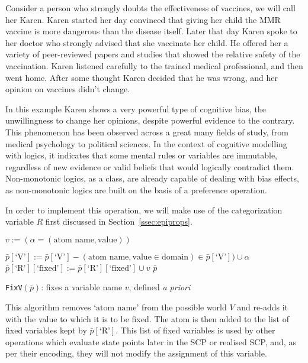 Consider a person who strongly doubts the effectiveness of vaccines, we will call her Karen. Karen started her day convinced that giving her child the MMR vaccine is more dangerous than the disease itself. Later that day Karen spoke to her doctor who strongly advised that she vaccinate her child. He offered her a variety of peer-reviewed papers and studies that showed the relative safety of the vaccination. Karen listened carefully to the trained medical professional, and then went home. After some thought Karen decided that he was wrong, and her opinion on vaccines didn't change.

In this example Karen shows a very powerful type of cognitive bias, the unwillingness to change her opinions, despite powerful evidence to the contrary. This phenomenon has been observed across a great many fields of study, from medical psychology\citep{brown2010omission}\citep{wroe2005feeling} to political sciences\citep{tappin2017heart}. In the context of cognitive modelling with logics, it indicates that some mental rules or variables are immutable, regardless of new evidence or valid beliefs that would logically contradict them. Non-monotonic logics, as a class, are already capable of dealing with bias effects, as non-monotonic logics are built on the basis of a preference operation.

In order to implement this operation, we will make use of the categorization variable $R$ first discussed in Section~\ref{ssec:epiprops}.

\begin{algorithm}[H]
\SetAlgoLined
{}
$v:= (\alpha = (\text{atom name}, \text{value}))$\;

{
$\bar{p}[\textrm{`V'}]:=\bar{p}[\textrm{`V'}] - (\text{atom name}, \text{value} \in \text{domain}) \in \bar{p}[\textrm{`V'}]) \cup \alpha$\;
$\bar{p}[\textrm{`R'}][\text{`fixed'}]:= \bar{p}[\textrm{`R'}][\text{`fixed'}] \cup v$\;
\Return $\bar{p}$
}

\caption{\texttt{FixV}$(\bar{p})$: fixes a variable name $v$, defined \textit{a priori}}
 \label{cogOp:fixV}
\end{algorithm}


This algorithm removes `$\text{atom name}$' from the possible world $V$ and re-adds it with the value to which it is to be fixed. The atom is then added to the list of fixed variables kept by $\bar{p}[\textrm{`R'}]$. This list of fixed variables is used by other operations which evaluate state points later in the SCP or realised SCP, and, as per their encoding, they will not modify the assignment of this variable.

